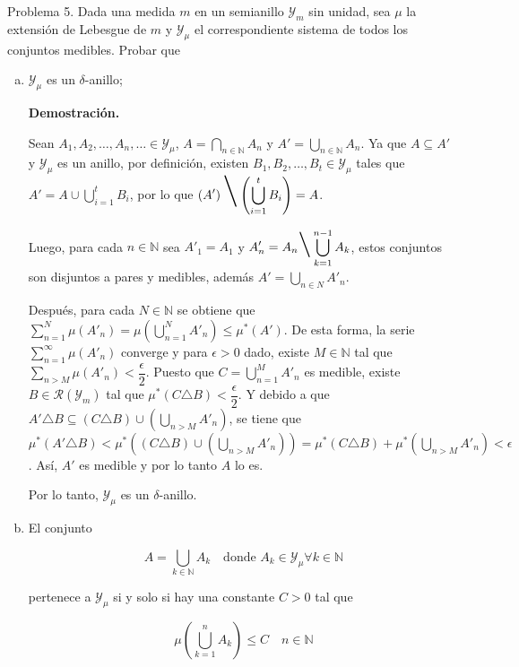 \documentclass[fleqn]{article}
\begin{document}
	Problema 5. Dada una medida $m$ en un semianillo $ \mathcal{Y}_m $ sin unidad, sea $ \mu $ la extensión de Lebesgue de $m$ y $ \mathcal{Y}_\mu $ el correspondiente sistema de todos los conjuntos medibles. Probar que

	\begin{enumerate}[a)]
		\item $ \mathcal{Y}_\mu $ es un $ \delta $-anillo;
		
		\textbf{Demostración.}

		Sean $ A_1, A_2, \ldots, A_n, \ldots \in \mathcal{Y}_\mu $, $ \displaystyle A = \bigcap_{n \in \mathbb{N}} A_n $ y $ \displaystyle A' = \bigcup_{n \in \mathbb{N}} A_n $. Ya que $ A \subseteq A' $ y $ \mathcal{Y}_\mu $ es un anillo, por definición, existen $ B_1, B_2, \ldots, B_t \in \mathcal{Y}_\mu $ tales que $ \displaystyle A' = A \cup \bigcup_{i = 1}^t B_i $, por lo que $ \displaystyle \left( A' \right) \mbox{\Huge \textbackslash} \left( \bigcup_{i = 1}^t B_i \right) = A $.

		Luego, para cada $ n \in \mathbb{N} $ sea $ A'_1 = A_1 $ y $ \displaystyle A'_n = A_n \mbox{\huge \textbackslash} \bigcup_{k=1}^{n-1} A_k $, estos conjuntos son disjuntos a pares y medibles, además $ \displaystyle A' = \bigcup_{n \in N} A'_n $.

		Después, para cada $ N \in \mathbb{N} $ se obtiene que $ \displaystyle \sum_{n=1}^N \mu (A'_n) = \mu \left( \bigcup_{n=1}^N A'_n \right) \leq \mu^* (A') $. De esta forma, la serie $ \displaystyle \sum_{n=1}^\infty \mu (A'_n) $ converge y para $ \epsilon > 0 $ dado, existe $ M \in \mathbb{N} $ tal que $ \displaystyle \sum_{n>M} \mu (A'_n) < \dfrac{\epsilon}{2} $. Puesto que $ \displaystyle C = \bigcup_{n=1}^M A'_n $ es medible, existe $ B \in \mathcal{R} (\mathcal{Y}_m) $ tal que $ \displaystyle \mu^* (C \triangle B) < \dfrac{\epsilon}{2} $. Y debido a que $  \displaystyle A' \triangle B \subseteq (C \triangle B) \cup \left( \bigcup_{n>M} A'_n \right) $, se tiene que $ \displaystyle \mu^* (A' \triangle B) < \displaystyle \mu^* \left((C \triangle B) \cup \left( \bigcup_{n>M} A'_n \right) \right) = \mu^* (C \triangle B) + \mu^* \left( \bigcup_{n>M} A'_n \right) < \epsilon $. Así, $ A' $ es medible y por lo tanto $ A $ lo es.	

		Por lo tanto, $ \mathcal{Y}_\mu $ es un $ \delta $-anillo.

		\item El conjunto
		
		\begin{equation*}
			A = \bigcup_{k \in \mathbb{N}} A_k \quad \mbox{donde } A_k \in \mathcal{Y}_\mu \forall k \in \mathbb{N}
		\end{equation*}

		pertenece a $ \mathcal{Y}_\mu $ si y solo si hay una constante $ C > 0 $ tal que

		\begin{equation*}
			\mu \left( \bigcup_{k=1}^n A_k \right) \leq C \quad n \in \mathbb{N}
		\end{equation*}
	\end{enumerate}
\end{document}
